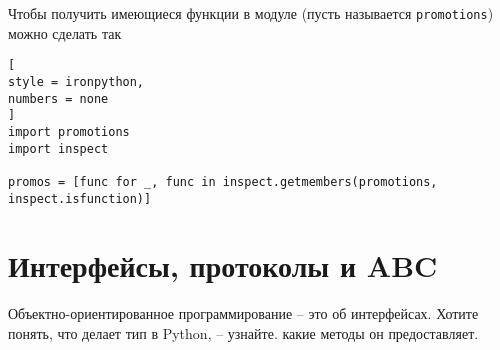 \documentclass[%
	11pt,
	a4paper,
	utf8,
		]{article}
\begin{document}
Чтобы получить имеющиеся функции в модуле (пусть называется \verb*|promotions|) можно сделать так \cite[]{ramalho:python-2022}
\begin{lstlisting}[
style = ironpython,
numbers = none
]
import promotions
import inspect

promos = [func for _, func in inspect.getmembers(promotions, inspect.isfunction)]
\end{lstlisting}

\section{ Интерфейсы, протоколы и ABC}

Объектно-ориентированное программирование -- это об интерфейсах. Хотите понять, что делает тип в Python, -- узнайте. какие методы он предоставляет.
\end{document}
